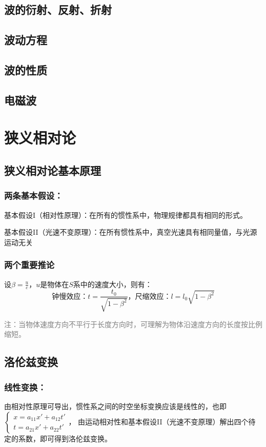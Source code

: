 \documentclass[zihao=-4,UTF8]{report}
\begin{document}
\section{波的衍射、反射、折射}
\section{波动方程}
\section{波的性质}
\section{电磁波}



\chapter{狭义相对论}
\thispagestyle{fancy}
\section{狭义相对论基本原理}

\subsection{两条基本假设：}
基本假设I（相对性原理）：在所有的惯性系中，物理规律都具有相同的形式。\par
基本假设II（光速不变原理）：在所有惯性系中，真空光速具有相同量值，与光源运动无关

\subsection{两个重要推论}
设$\beta = \frac{u}{c}$，$u$是物体在$S$系中的速度大小，则有：
\begin{equation*}
  \text{钟慢效应：}t = \frac{t_0}{\sqrt{1-\beta^2}}
  \text{，尺缩效应：}l = l_0\sqrt{1-\beta^2}
\end{equation*}\par
\par
\textcolor{gray}{注：当物体速度方向不平行于长度方向时，可理解为物体沿速度方向的长度按比例缩短。}

\section{洛伦兹变换}
\subsection{线性变换：}
由相对性原理可导出，惯性系之间的时空坐标变换应该是线性的，也即$\left\{\begin{matrix}
  x = a_{11}x'+a_{12}t'\\
  t = a_{21}x'+a_{22}t'
 \end{matrix}\right.$，
 由运动相对性和基本假设II（光速不变原理）解出四个待定的系数，即可得到洛伦兹变换。
\end{document}
